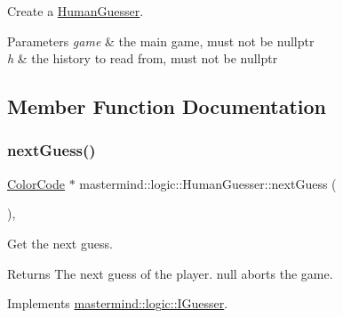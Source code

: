 Create a \hyperlink{classmastermind_1_1logic_1_1_human_guesser}{Human\+Guesser}. 


\begin{DoxyParams}{Parameters}
{\em game} & the main game, must not be {\ttfamily nullptr} \\
\hline
{\em h} & the history to read from, must not be {\ttfamily nullptr} \\
\hline
\end{DoxyParams}


\subsection{Member Function Documentation}
\hypertarget{classmastermind_1_1logic_1_1_human_guesser_a5a165250f667fd40099c43cd3caf487c}{}\label{classmastermind_1_1logic_1_1_human_guesser_a5a165250f667fd40099c43cd3caf487c} 
\subsubsection{\texorpdfstring{next\+Guess()}{nextGuess()}}
{\footnotesize\ttfamily \hyperlink{classmastermind_1_1logic_1_1_color_code}{Color\+Code} $\ast$ mastermind\+::logic\+::\+Human\+Guesser\+::next\+Guess (\begin{DoxyParamCaption}{ }\end{DoxyParamCaption})\hspace{0.3cm}{\ttfamily [override]}, {\ttfamily [virtual]}}



Get the next guess. 

\begin{DoxyReturn}{Returns}
The next guess of the player. {\ttfamily null} aborts the game. 
\end{DoxyReturn}


Implements \hyperlink{classmastermind_1_1logic_1_1_i_guesser_a285f709f2076098acb5bc7c49a1435c7}{mastermind\+::logic\+::\+I\+Guesser}.

\hypertarget{classmastermind_1_1logic_1_1_human_guesser_ad1c868e2dac07c1af9bb8935783e2e9b}{}\label{classmastermind_1_1logic_1_1_human_guesser_ad1c868e2dac07c1af9bb8935783e2e9b} 
